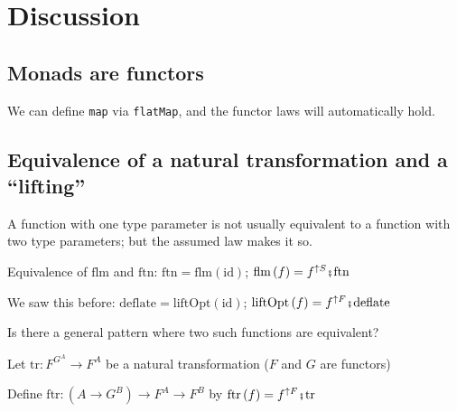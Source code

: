 \begin{comment}
A curious example: The functor $Q^{A}\equiv\left(A\rightarrow Z\right)\rightarrow1+A$
is not a monad (and not even a lawful applicative) but $M^{A}\triangleq\left(A\rightarrow1+1\right)\rightarrow1+A$
is a \textsf{``}search monad\textsf{''}. More generally, a \textsf{``}selector monad\textsf{''} is
$\left(A\rightarrow P^{Q}\right)\rightarrow P^{A}$ for any functor
$P^{A}$ and any fixed type $Q$. Even more generally, we can use
a Kleisli$_{P}$-filtered functor instead of $P^{Q}$.
\end{comment}


\section{Discussion}

\subsection{Monads are functors}

We can define \lstinline!map! via \lstinline!flatMap!, and the functor
laws will automatically hold.

\subsection{Equivalence of a natural transformation and a \textsf{``}lifting\textsf{''}}

A function with one type parameter is not usually equivalent to a
function with two type parameters; but the assumed law makes it so.

Equivalence of $\text{flm}$ and $\text{ftn}$: $\text{ftn}=\text{flm}\left(\text{id}\right)$;
$\text{flm}\left(f\right)=f^{\uparrow S}\bef\text{ftn}$ 

We saw this before: $\text{deflate}=\text{liftOpt}\left(\text{id}\right)$;
$\text{liftOpt}\left(f\right)=f^{\uparrow F}\bef\text{deflate}$ 

Is there a general pattern where two such functions are equivalent?

Let $\text{tr}:F^{G^{A}}\rightarrow F^{A}$ be a natural transformation
($F$ and $G$ are functors)

Define $\text{ftr}:\left(A\rightarrow G^{B}\right)\rightarrow F^{A}\rightarrow F^{B}$
by $\text{ftr}\,(f)=f^{\uparrow F}\bef\text{tr}$ 

